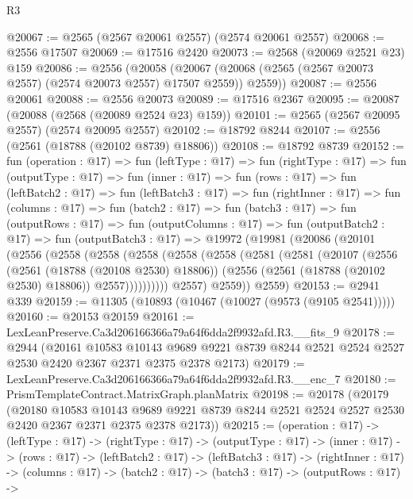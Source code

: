 \begin{lexlean}{R3}
\begin{coremodule}
@20067 := @2565 (@2567 @20061 @2557) (@2574 @20061 @2557)
@20068 := @2556 @17507
@20069 := @17516 @2420
@20073 := @2568 (@20069 @2521 @23) @159
@20086 := @2556
    (@20058 (@20067 (@20068 (@2565 (@2567 @20073 @2557) (@2574 @20073 @2557) @17507 @2559)) @2559))
@20087 := @2556 @20061
@20088 := @2556 @20073
@20089 := @17516 @2367
@20095 := @20087 (@20088 (@2568 (@20089 @2524 @23) @159))
@20101 := @2565 (@2567 @20095 @2557) (@2574 @20095 @2557)
@20102 := @18792 @8244
@20107 := @2556 (@2561 (@18788 (@20102 @8739) @18806))
@20108 := @18792 @8739
@20152 := fun (operation : @17) =>
  fun (leftType : @17) =>
  fun (rightType : @17) =>
  fun (outputType : @17) =>
  fun (inner : @17) =>
  fun (rows : @17) =>
  fun (leftBatch2 : @17) =>
  fun (leftBatch3 : @17) =>
  fun (rightInner : @17) =>
  fun (columns : @17) =>
  fun (batch2 : @17) =>
  fun (batch3 : @17) =>
  fun (outputRows : @17) =>
  fun (outputColumns : @17) =>
  fun (outputBatch2 : @17) =>
  fun (outputBatch3 : @17) =>
  @19972
    (@19981
      (@20086
        (@20101
          (@2556
            (@2558
              (@2558
                (@2558
                  (@2558
                    (@2558
                      (@2581
                        (@2581
                          (@20107
                            (@2556
                              (@2561 (@18788 (@20108 @2530) @18806))
                              (@2556 (@2561 (@18788 (@20102 @2530) @18806)) @2557))))))))))
            @2557)
          @2559))
      @2559)
@20153 := @2941 @339
@20159 := @11305 (@10893 (@10467 (@10027 (@9573 (@9105 @2541)))))
@20160 := @20153 @20159
@20161 := LexLeanPreserve.Ca3d206166366a79a64f6dda2f9932afd.R3.__fits_9
@20178 := @2944
    (@20161
      @10583
      @10143
      @9689
      @9221
      @8739
      @8244
      @2521
      @2524
      @2527
      @2530
      @2420
      @2367
      @2371
      @2375
      @2378
      @2173)
@20179 := LexLeanPreserve.Ca3d206166366a79a64f6dda2f9932afd.R3.__enc_7
@20180 := PrismTemplateContract.MatrixGraph.planMatrix
@20198 := @20178
    (@20179
      (@20180
        @10583
        @10143
        @9689
        @9221
        @8739
        @8244
        @2521
        @2524
        @2527
        @2530
        @2420
        @2367
        @2371
        @2375
        @2378
        @2173))
@20215 := (operation : @17) ->
  (leftType : @17) ->
  (rightType : @17) ->
  (outputType : @17) ->
  (inner : @17) ->
  (rows : @17) ->
  (leftBatch2 : @17) ->
  (leftBatch3 : @17) ->
  (rightInner : @17) ->
  (columns : @17) ->
  (batch2 : @17) ->
  (batch3 : @17) ->
  (outputRows : @17) ->

\end{coremodule}
\end{lexlean}
